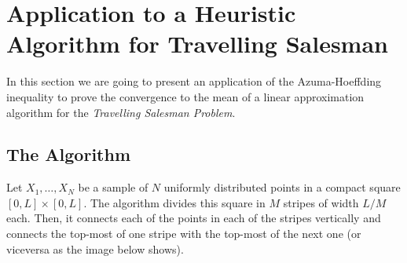 \chapter{Application to a Heuristic Algorithm for Travelling Salesman}

In this section we are going to present an application of the Azuma-Hoeffding inequality to prove the convergence to the mean of a linear approximation algorithm for the \textit{Travelling Salesman Problem}. 

\section*{The Algorithm}

Let $X_1,\ldots, X_N$ be a sample of $N$ uniformly distributed points in a compact square $[0,L]\times [0,L]$. The algorithm divides this square in $M$ stripes of width $L/M$ each. Then, it connects each of the points in each of the stripes vertically and connects the top-most of one stripe with the top-most of the next one (or viceversa as the image below shows).

\begin{figure}[h]\label{TSP:pic0}
    \centering
\end{figure}

